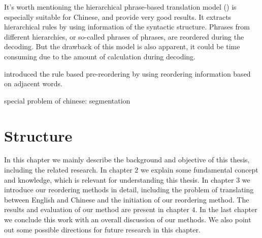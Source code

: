 It's worth mentioning the hierarchical phrase-based translation model (\cite{hier}) is especially suitable for Chinese, and provide very good results. It extracts hierarchical rules by using information of the syntactic structure. Phrases from different hierarchies, or so-called phrases of phrases, are reordered during the decoding. But the drawback of this model is also apparent, it could be time consuming due to the amount of calculation during decoding.




\cite{short} introduced the rule based pre-reordering by using reordering information based on adjacent words. 
 


special problem of chinese: segmentation

\section{Structure}
\label{ch:Introduction:sec:Structure}

In this chapter we mainly describe the background and objective of this thesis, including the related research. In chapter $2$ we explain some fundamental concept and knowledge, which is relevant for understanding this thesis. In chapter $3$ we introduce our reordering methods in detail, including the problem of translating between English and Chinese and the initiation of our reordering method. The results and evaluation of our method are present in chapter $4$. In the last chapter we conclude this work with an overall discussion of our methods. We also point out some possible directions for future research in this chapter.
